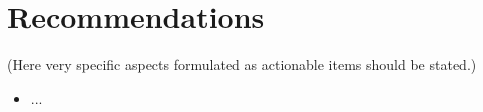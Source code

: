 \section{Recommendations}

(Here very specific aspects formulated as actionable items should be stated.)

\begin{itemize}
  \item ...
\end{itemize}
